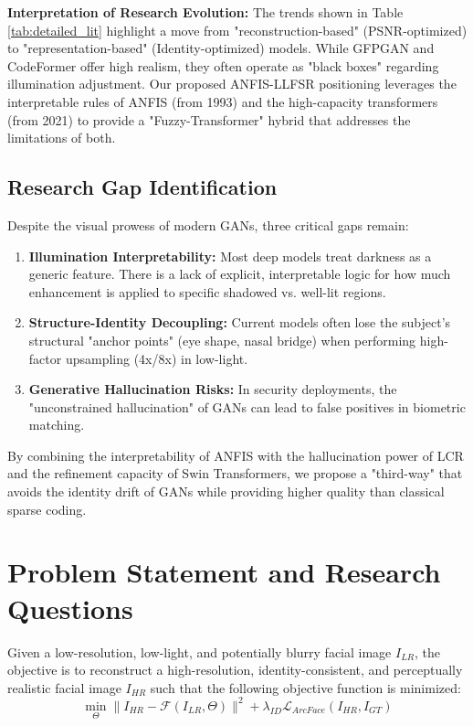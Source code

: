 \textbf{Interpretation of Research Evolution:} The trends shown in Table \ref{tab:detailed_lit} highlight a move from "reconstruction-based" (PSNR-optimized) to "representation-based" (Identity-optimized) models. While GFPGAN and CodeFormer offer high realism, they often operate as "black boxes" regarding illumination adjustment. Our proposed ANFIS-LLFSR positioning leverages the interpretable rules of ANFIS (from 1993) and the high-capacity transformers (from 2021) to provide a "Fuzzy-Transformer" hybrid that addresses the limitations of both.

\subsection{Research Gap Identification}
Despite the visual prowess of modern GANs, three critical gaps remain:
\begin{enumerate}
    \item \textbf{Illumination Interpretability:} Most deep models treat darkness as a generic feature. There is a lack of explicit, interpretable logic for how much enhancement is applied to specific shadowed vs. well-lit regions.
    \item \textbf{Structure-Identity Decoupling:} Current models often lose the subject's structural "anchor points" (eye shape, nasal bridge) when performing high-factor upsampling (4x/8x) in low-light.
    \item \textbf{Generative Hallucination Risks:} In security deployments, the "unconstrained hallucination" of GANs can lead to false positives in biometric matching.
\end{enumerate}

By combining the interpretability of ANFIS with the hallucination power of LCR and the refinement capacity of Swin Transformers, we propose a "third-way" that avoids the identity drift of GANs while providing higher quality than classical sparse coding.

\section{Problem Statement and Research Questions}
Given a low-resolution, low-light, and potentially blurry facial image $I_{LR}$, the objective is to reconstruct a high-resolution, identity-consistent, and perceptually realistic facial image $I_{HR}$ such that the following objective function is minimized:
\begin{equation}
    \min_{\Theta} \|I_{HR} - \mathcal{F}(I_{LR}, \Theta)\|^2 + \lambda_{ID} \mathcal{L}_{ArcFace}(I_{HR}, I_{GT})
    \label{eq:total_min}
\end{equation}

